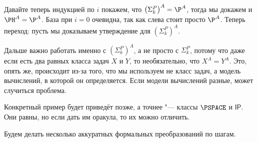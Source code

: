 	Давайте теперь индукцией по $i$ покажем, что $\left(\Sigma_k^P\right)^A = \P^A$, тогда мы докажем и $\PH^A=\P^A$.
	База при $i=0$ очевидна, так как слева стоит просто $\P^A$.
	Теперь переход: пусть мы доказываем утверждение для $\left(\Sigma_k^P\right)^A$.
	\begin{Rem}
		Дальше важно работать именно с $\left(\Sigma_k^P\right)^A$, а не просто с $\Sigma_k^P$, потому что
		даже если есть два равных класса задач $X$ и $Y$, то необязательно, что $X^A=Y^A$.
		Это, опять же, происходит из-за того, что мы используем не класс задач, а модель вычислений, в которой он определяется.
		Если модели вычислений разные, может случиться проблема.
		
		Конкретный пример будет приведёт позже, а точнее "--- классы $\PSPACE$ и $\mathsf{IP}$.
		Они равны, но если дать им оракула, то их можно отличить.
	\end{Rem}
	Будем делать несколько аккуратных формальных преобразований по шагам.
